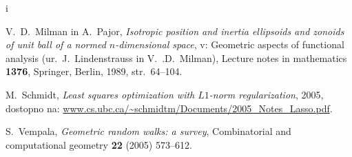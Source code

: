 i\documentclass[mat1]{fmfdelo}
\begin{document}
\begin{thebibliography}{99}
V.~D.~Milman in A.~Pajor, \emph{Isotropic position and inertia ellipsoids and zonoids of unit ball of a normed $n$-dimensional space}, v: Geometric aspects of functional analysis (ur.\ J.~Lindenstrauss in
V.~.D.~Milman), Lecture notes in mathematics \textbf{1376}, Springer, Berlin, 1989, str.\ 64--104.

M.~Schmidt, \emph{Least squares optimization with $L1$-norm regularization}, 2005, dostopno na: \url{www.cs.ubc.ca/~schmidtm/Documents/2005_Notes_Lasso.pdf}.

S.~Vempala, \emph{Geometric random walks: a survey}, Combinatorial and computational geometry \textbf{22} (2005) 573--612.



\end{thebibliography}
\end{document}
